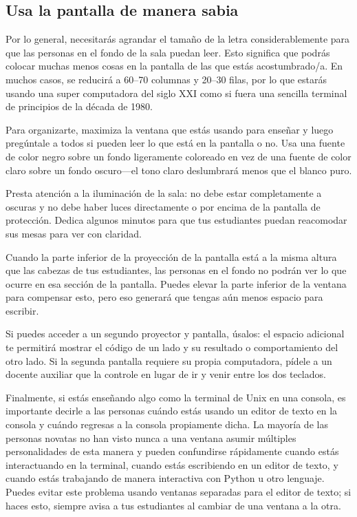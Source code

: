 \subsection*{Usa la pantalla de manera sabia}

Por lo general, necesitarás agrandar el tamaño de la letra considerablemente
para que las personas en el fondo de la sala puedan leer.
Esto significa que podrás colocar muchas menos cosas en la pantalla de las que estás acostumbrado/a.
En muchos casos, se reducirá a 60--70 columnas y 20--30 filas,
por lo que estarás usando una super computadora del siglo XXI
como si fuera una sencilla terminal de principios de la década de 1980.

Para organizarte,
maximiza la ventana que estás usando para enseñar
y luego pregúntale a todos si pueden leer lo que está en la pantalla o no.
Usa una fuente de color negro sobre un fondo ligeramente coloreado en vez 
de una fuente de color claro sobre un fondo oscuro---el tono claro deslumbrará
menos que el blanco puro.

Presta atención a la iluminación de la sala:
no debe estar completamente a oscuras y no debe haber luces directamente
o por encima de la pantalla de protección.
Dedica algunos minutos para que tus estudiantes puedan reacomodar sus mesas
para ver con claridad.

Cuando la parte inferior de la proyección de la pantalla está a la misma altura que las cabezas de tus estudiantes,
las personas en el fondo no podrán ver lo que ocurre en esa sección de la pantalla.
Puedes elevar la parte inferior de la ventana para compensar esto,
pero eso generará que tengas aún menos espacio para escribir.

Si puedes acceder a un segundo proyector y pantalla,
úsalos:
el espacio adicional te permitirá mostrar el código de un lado
y su resultado o comportamiento del otro lado.
Si la segunda pantalla requiere su propia computadora,
pídele a un docente auxiliar que la controle
en lugar de ir y venir entre los dos teclados.

Finalmente,
si estás enseñando algo como la terminal de Unix en una consola,
es importante decirle a las personas cuándo estás usando un editor de texto en la consola
y cuándo regresas a la consola propiamente dicha.
La mayoría de las personas novatas no han visto nunca a una ventana asumir múltiples personalidades de esta manera
y pueden confundirse rápidamente
cuando estás interactuando en la terminal,
cuando estás escribiendo en un editor de texto,
y cuando estás trabajando de manera interactiva con Python u otro lenguaje.
Puedes evitar este problema usando ventanas separadas para el editor de texto;
si haces esto,
siempre avisa a tus estudiantes al cambiar de una ventana a la otra.

